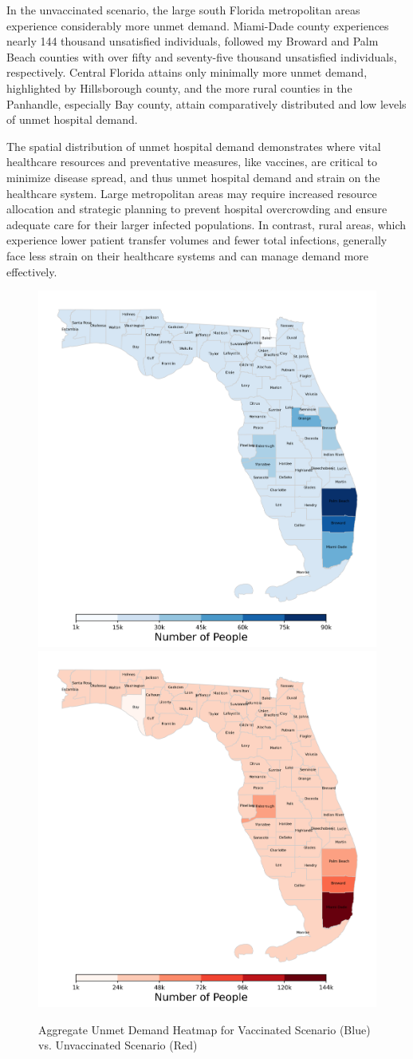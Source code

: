 \documentclass{article}
\begin{document}
In the unvaccinated scenario, the large south Florida metropolitan areas experience considerably more unmet demand. Miami-Dade county experiences nearly 144 thousand unsatisfied individuals, followed my Broward and Palm Beach counties with over fifty and seventy-five thousand unsatisfied individuals, respectively. Central Florida attains only minimally more unmet demand, highlighted by Hillsborough county, and the more rural counties in the Panhandle, especially Bay county, attain comparatively distributed and low levels of unmet hospital demand. 

The spatial distribution of unmet hospital demand demonstrates where vital healthcare resources and preventative measures, like vaccines, are critical to minimize disease spread, and thus unmet hospital demand and strain on the healthcare system. Large metropolitan areas may require increased resource allocation and strategic planning to prevent hospital overcrowding and ensure adequate care for their larger infected populations. In contrast, rural areas, which experience lower patient transfer volumes and fewer total infections, generally face less strain on their healthcare systems and can manage demand more effectively.

\begin{figure}
    \centering
    \includegraphics[width=0.43\linewidth]{pics/totalUnmetDemandVax0.1.png}
    \includegraphics[width=0.43\linewidth]{pics/totalUnmetDemandNoVax.png}
   \caption{Aggregate Unmet Demand Heatmap for Vaccinated Scenario (Blue) vs. Unvaccinated Scenario (Red)}\label{fig:udHeatmap}
\end{figure}
\end{document}
